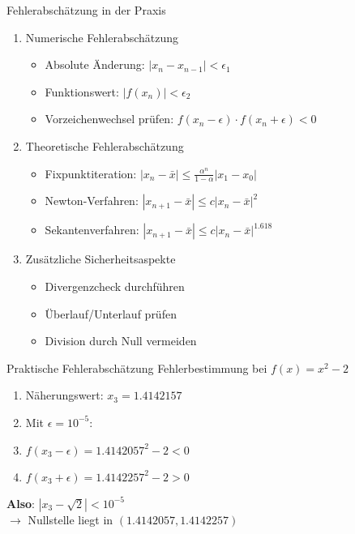 \begin{KR}{Fehlerabschätzung in der Praxis}
\begin{enumerate}
    \item Numerische Fehlerabschätzung
    \begin{itemize}
        \item Absolute Änderung: $|x_n - x_{n-1}| < \epsilon_1$
        \item Funktionswert: $|f(x_n)| < \epsilon_2$
        \item Vorzeichenwechsel prüfen: $f(x_n-\epsilon) \cdot f(x_n+\epsilon) < 0$
    \end{itemize}
    
    \item Theoretische Fehlerabschätzung
    \begin{itemize}
        \item Fixpunktiteration: $|x_n-\bar{x}| \leq \frac{\alpha^n}{1-\alpha}|x_1-x_0|$
        \item Newton-Verfahren: $|x_{n+1}-\bar{x}| \leq c|x_n-\bar{x}|^2$
        \item Sekantenverfahren: $|x_{n+1}-\bar{x}| \leq c|x_n-\bar{x}|^{1.618}$
    \end{itemize}
    
    \item Zusätzliche Sicherheitsaspekte
    \begin{itemize}
        \item Divergenzcheck durchführen
        \item Überlauf/Unterlauf prüfen
        \item Division durch Null vermeiden
    \end{itemize}
\end{enumerate}
\end{KR}

\begin{example2}{Praktische Fehlerabschätzung} Fehlerbestimmung bei $f(x)=x^2-2$
    \vspace{-1mm}\\
    \begin{minipage}[t]{0.6\textwidth}
        \vspace{-3mm}
        \begin{enumerate}
            \item Näherungswert: $x_3 = 1.4142157$
            \item Mit $\epsilon = 10^{-5}$:
            \item $f(x_3-\epsilon) = 1.4142057^2 - 2 < 0$
            \item $f(x_3+\epsilon) = 1.4142257^2 - 2 > 0$
        \end{enumerate}
    \end{minipage}
    \begin{minipage}[t]{0.35\textwidth}
        \textbf{Also}: $|x_3-\sqrt{2}| < 10^{-5}$
        \vspace{-1mm}\\
        $\rightarrow$ Nullstelle liegt in $(1.4142057, 1.4142257)$
    \end{minipage}
\end{example2}

